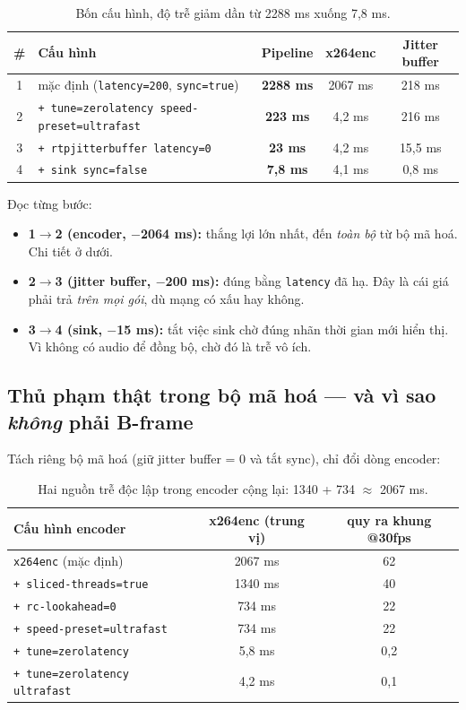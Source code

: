 \documentclass[12pt]{ai_conquer2026}
\begin{document}
\begin{table}[h]
\centering
\begin{tabular}{@{}clccc@{}}
\toprule
\# & Cấu hình & Pipeline & x264enc & Jitter buffer \\
\midrule
1 & mặc định (\texttt{latency=200}, \texttt{sync=true}) & \textbf{2288 ms} & 2067 ms & 218 ms \\
2 & \texttt{+ tune=zerolatency speed-preset=ultrafast}  & \textbf{223 ms}  & 4,2 ms  & 216 ms \\
3 & \texttt{+ rtpjitterbuffer latency=0}                & \textbf{23 ms}   & 4,2 ms  & 15,5 ms \\
4 & \texttt{+ sink sync=false}                          & \textbf{7,8 ms}  & 4,1 ms  & 0,8 ms \\
\bottomrule
\end{tabular}
\caption{Bốn cấu hình, độ trễ giảm dần từ 2288 ms xuống 7,8 ms.}
\end{table}

Đọc từng bước:

\begin{itemize}
\item \textbf{1$\to$2 (encoder, $-$2064 ms):} thắng lợi lớn nhất, đến \emph{toàn
      bộ} từ bộ mã hoá. Chi tiết ở dưới.
\item \textbf{2$\to$3 (jitter buffer, $-$200 ms):} đúng bằng \texttt{latency} đã
      hạ. Đây là cái giá phải trả \emph{trên mọi gói}, dù mạng có xấu hay không.
\item \textbf{3$\to$4 (sink, $-$15 ms):} tắt việc sink chờ đúng nhãn thời gian
      mới hiển thị. Vì không có audio để đồng bộ, chờ đó là trễ vô ích.
\end{itemize}

\subsection{Thủ phạm thật trong bộ mã hoá --- và vì sao \emph{không} phải B-frame}

Tách riêng bộ mã hoá (giữ jitter buffer = 0 và tắt sync), chỉ đổi dòng encoder:

\begin{table}[h]
\centering
\begin{tabular}{@{}lcc@{}}
\toprule
Cấu hình encoder & x264enc (trung vị) & quy ra khung @30fps \\
\midrule
\texttt{x264enc} (mặc định)              & 2067 ms & 62 \\
\texttt{+ sliced-threads=true}           & 1340 ms & 40 \\
\texttt{+ rc-lookahead=0}                & 734 ms  & 22 \\
\texttt{+ speed-preset=ultrafast}        & 734 ms  & 22 \\
\texttt{+ tune=zerolatency}              & 5,8 ms  & 0,2 \\
\texttt{+ tune=zerolatency ultrafast}    & 4,2 ms  & 0,1 \\
\bottomrule
\end{tabular}
\caption{Hai nguồn trễ độc lập trong encoder cộng lại: 1340 + 734 $\approx$ 2067 ms.}
\end{table}
\end{document}
